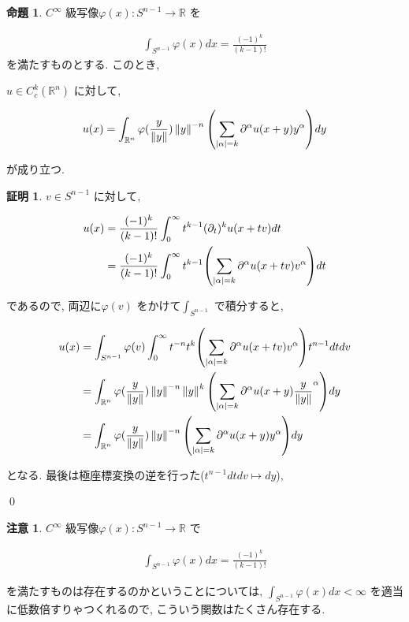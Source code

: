 \documentclass[10pt, fleqn, label-section=none]{bxjsarticle}
\theoremstyle{definition}
\newtheorem{prop}[dfn]{命題}
\newtheorem*{pf*}{証明}
\newtheorem{remark}[dfn]{注意}
\newcommand{\paren}[1]{\mleft( #1\mright )}
\newcommand{\abs}[1]{\left|#1\right|}
\newcommand{\norm}[1]{\left\|#1\right\|}
\renewcommand{\;}{\, ; \,}
\begin{document}
\begin{prop} $C^\infty$ 級写像$\varphi(x): S^{n-1} \rightarrow \mathbb R$ を

\begin{align*} \int_{S^{n-1}} \varphi (x) dx = \frac{(-1)^k}{(k-1)!}   \end{align*} 
を満たすものとする. このとき, 

$u \in C_c^k (\mathbb R^n) $ に対して, 

\begin{align*} u(x) = \int_{\mathbb R^n} \varphi(\frac{y}{\norm y})  \norm y^{-n}   \paren{ \sum_{\abs \alpha = k } \partial^\alpha u(x+y) y^\alpha }   dy        \end{align*}

が成り立つ. 

\end{prop}
\begin{pf*}$v \in S^{n-1}$ に対して, 

\begin{align*} u(x) &= \frac{(-1)^k}{(k-1)!} \int_0^\infty t^{k-1} (\partial_t ) ^k u (x + tv) dt 
\\&=    \frac{(-1)^k}{(k-1)!} \int_0^\infty t^{k-1} \paren{ \sum_{\abs \alpha = k } \partial^\alpha u(x+tv) v^\alpha }         dt    \end{align*}

であるので, 両辺に$\varphi(v)$ をかけて$\int_{S^{n-1}}$ で積分すると, 

\begin{align*} u(x) &= \int_{S^{n-1}} \varphi(v) \int_0^\infty  t^{-n}t^{k} \paren{ \sum_{\abs \alpha = k } \partial^\alpha u(x+tv) v^\alpha }   t^{n-1} dt dv
\\&=  \int_{\mathbb R^n} \varphi(\frac{y}{\norm y})  \norm y^{-n} \norm y ^{k} \paren{ \sum_{\abs \alpha = k } \partial^\alpha u(x+y) {\frac{y}{\norm y}}^\alpha }   dy
\\&= \int_{\mathbb R^n} \varphi(\frac{y}{\norm y})  \norm y^{-n}   \paren{ \sum_{\abs \alpha = k } \partial^\alpha u(x+y) y^\alpha }   dy    \end{align*}

となる. 最後は極座標変換の逆を行った($t^{n-1} dt dv \mapsto dy $),

\qed
\end{pf*}






\begin{remark}$C^\infty$ 級写像$\varphi(x): S^{n-1} \rightarrow \mathbb R$ で

\begin{align*} \int_{S^{n-1}} \varphi (x) dx = \frac{(-1)^k}{(k-1)!}   \end{align*}

を満たすものは存在するのかということについては, $\int_{S^{n-1}} \varphi (x) dx  < \infty$ を適当に低数倍すりゃつくれるので, こういう関数はたくさん存在する. 

\end{remark}
\end{document}
